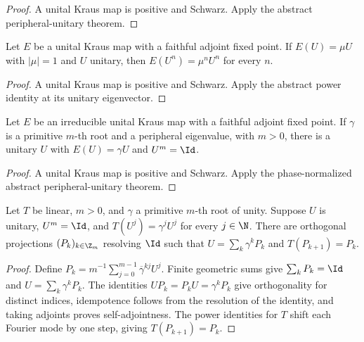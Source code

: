 \begin{proof}\leanok
    A unital Kraus map is positive and Schwarz. Apply the abstract
    peripheral-unitary theorem.
\end{proof}

\begin{lemma}
    \label{lem:peripheral_unitary_powers}
    \leanok
    Let $E$ be a unital Kraus map with a faithful adjoint fixed point.
    If $E(U)=\mu U$ with $|\mu|=1$ and $U$ unitary, then
    $E(U^n)=\mu^nU^n$ for every $n$.
\end{lemma}

\begin{proof}\leanok
    A unital Kraus map is positive and Schwarz. Apply the abstract power
    identity at its unitary eigenvector.
\end{proof}

\begin{lemma}
    \label{lem:normalized_peripheral_unitary}
    \leanok
    Let $E$ be an irreducible unital Kraus map with a faithful adjoint fixed
    point. If $\gamma$ is a primitive $m$-th root and a peripheral eigenvalue,
    with $m>0$, there is a unitary $U$ with $E(U)=\gamma U$ and $U^m=\Id$.
\end{lemma}

\begin{proof}\leanok
    A unital Kraus map is positive and Schwarz. Apply the phase-normalized
    abstract peripheral-unitary theorem.
\end{proof}

\begin{lemma}
    \label{lem:cyclic_projections_from_peripheral_unitary}
    \leanok
    Let $T$ be linear, $m>0$, and $\gamma$ a primitive $m$-th root of unity.
    Suppose $U$ is unitary, $U^m=\Id$, and
    $T(U^j)=\gamma^jU^j$ for every $j\in\N$. There are orthogonal
    projections $(P_k)_{k\in\Z_m}$ resolving $\Id$ such that
    $U=\sum_k\gamma^kP_k$ and $T(P_{k+1})=P_k$.
\end{lemma}

\begin{proof}\leanok
    Define $P_k=m^{-1}\sum_{j=0}^{m-1}\overline\gamma^{kj}U^j$.
    Finite geometric sums give $\sum_kP_k=\Id$ and
    $U=\sum_k\gamma^kP_k$. The identities
    $UP_k=P_kU=\gamma^kP_k$ give orthogonality for distinct indices,
    idempotence follows from the resolution of the identity, and taking
    adjoints proves self-adjointness. The power identities for $T$ shift
    each Fourier mode by one step, giving $T(P_{k+1})=P_k$.
\end{proof}

